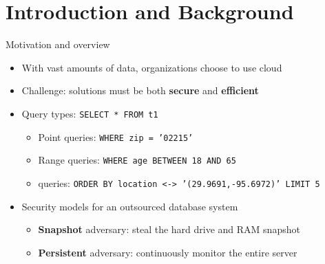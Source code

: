 \section{Introduction and Background}

	\begin{frame}{Motivation and overview}

		\begin{itemize}
			\item<1-> With vast amounts of data, organizations choose to use cloud
			\item<1-> \alert{Challenge:} solutions must be both \textbf{secure} and \textbf{efficient}
			\item<2-> Query types: \texttt{SELECT * FROM t1 }
				\begin{itemize}
					\item<1,2,5-> Point queries: \texttt{WHERE zip = '02215'}
					\item<1,3,5-> Range queries: \texttt{WHERE age BETWEEN 18 AND 65}
					\item<1,4,5-> \knn{} queries: \texttt{ORDER BY location <-> '(29.9691,-95.6972)' LIMIT 5} %
				\end{itemize}
			\item<5-> Security models for an outsourced database system
				\begin{itemize}
					\item<1-4,5> \textbf{Snapshot} adversary: steal the hard drive and RAM snapshot %
					\item<1-4,6> \textbf{Persistent} adversary: continuously monitor the entire server %
				\end{itemize}
		\end{itemize}

	\end{frame}

